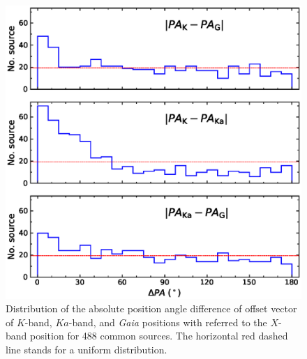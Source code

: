 \documentclass{aa-note}   %
\begin{document}
\begin{figure}[hbtp]
    \centering
    \includegraphics[width=\columnwidth]{figs/pa-diff}
    \caption[]{\label{fig:pa-diff}
        Distribution of the absolute position angle difference of offset vector of $K$-band, $Ka$-band, and \textit{Gaia} positions with referred to the $X$-band position for 488 common sources. 
        The horizontal red dashed line stands for a uniform distribution.
    }
\end{figure}
\end{document}
